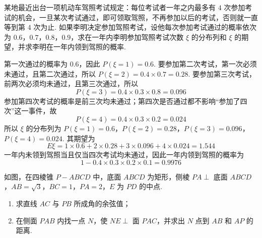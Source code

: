 \begin{problem}
某地最近出台一项机动车驾照考试规定：每位考试者一年之内最多有 \(4\) 次参加考试的机会，一旦某次考试通过，即可领取驾照，不再参加以后的考试，否则就一直等到第 \(4\) 次为止. 如果李明决定参加驾照考试，设他每次参加考试通过的概率依次为 \(0.6\)，\(0.7\)，\(0.8\)，\(0.9\)，求在一年内李明参加驾照考试次数 \(\xi\) 的分布列和 \(\xi\) 的期望，并求李明在一年内领到驾照的概率.
\end{problem}

\begin{solution}
第一次通过的概率为 \(0.6\)，因此 \(P(\xi=1)=0.6\). 要参加第二次考试，第一次必须未通过，且第二次通过，所以 \(P(\xi=2)=0.4\times0.7=0.28\). 要参加第三次考试，前两次必须均未通过，且第三次通过，所以
\[
P(\xi=3)=0.4\times0.3\times0.8=0.096
\]
参加第四次考试的概率是前三次均未通过；第四次是否通过都不影响“参加了四次”这一事件，故
\[
P(\xi=4)=0.4\times0.3\times0.2=0.024
\]
所以 \(\xi\) 的分布列为 \(P(\xi=1)=0.6\)，\(P(\xi=2)=0.28\)，\(P(\xi=3)=0.096\)，\(P(\xi=4)=0.024\). 其期望为
\[
E\xi=1\times0.6+2\times0.28+3\times0.096+4\times0.024=1.544
\]
一年内未领到驾照当且仅当四次考试均未通过，因此一年内领到驾照的概率为
\[
1-0.4\times0.3\times0.2\times0.1=0.9976
\]
\end{solution}

\begin{problem}
如图，在四棱锥 \(P - ABCD\) 中，底面 \(ABCD\) 为矩形，侧棱 \(PA \perp\) 底面 \(ABCD\)，\(AB = \sqrt{3}\)，\(BC = 1\)，\(PA = 2\)，\(E\) 为 \(PD\) 的中点.

\begin{enumerate}
\item 求直线 \(AC\) 与 \(PB\) 所成角的余弦值；
\item 在侧面 \(PAB\) 内找一点 \(N\)，使 \(NE \perp\) 面 \(PAC\)，并求出 \(N\) 点到 \(AB\) 和 \(AP\) 的距离.
\end{enumerate}

\end{problem}

